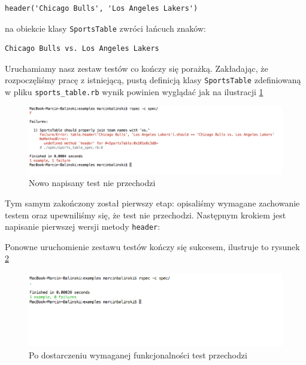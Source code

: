 \begin{lstlisting} 
header('Chicago Bulls', 'Los Angeles Lakers')
\end{lstlisting}
    
    na obiekcie klasy \texttt{SportsTable} zwróci łańcuch znaków:
    
\begin{lstlisting} 
Chicago Bulls vs. Los Angeles Lakers
\end{lstlisting}
    
    Uruchamiamy nasz zestaw testów co kończy się porażką. Zakładając, że rozpoczęliśmy pracę z istniejącą, pustą definicją klasy \texttt{SportsTable} zdefiniowaną w pliku \texttt{sports\_table.rb} wynik powinien wyglądać jak na ilustracji \ref{example1_failure}
    
    \vspace{5 mm}
     \begin{figure}[!h]
   		\begin{center}
   			\includegraphics[width=\linewidth]{images/example1_failure.png}
   			\caption{Nowo napisany test nie przechodzi}
   			\label{example1_failure}
   		\end{center}
   	\end{figure}
    
    Tym samym zakończony został pierwszy etap: opisaliśmy wymagane zachowanie testem oraz upewniliśmy się, że test nie przechodzi. Następnym krokiem jest napisanie pierwszej wersji metody \texttt{header}:
    
    
    
    Ponowne uruchomienie zestawu testów kończy się sukcesem, ilustruje to rysunek \ref{example1_success}
    
     \clearpage
     
     \begin{figure}[!h]
   		\begin{center}
   			\includegraphics[width=\linewidth]{images/example1_success.png}
   			\caption{Po dostarczeniu wymaganej funkcjonalności test przechodzi}
   			\label{example1_success}
   		\end{center}
   	\end{figure}
    
